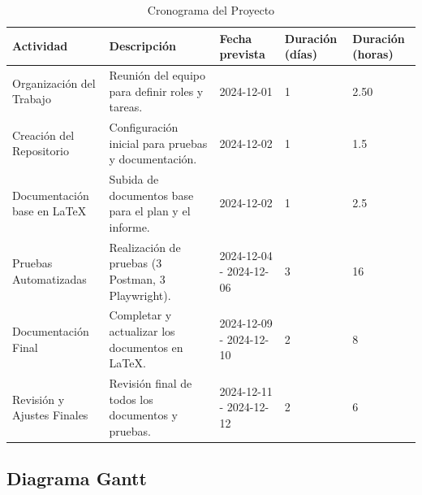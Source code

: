 \documentclass[stu, 12pt, letterpaper, donotrepeattitle, floatsintext, natbib]{apa7}
\begin{document}
\begin{table}[H]
    \centering
    \caption{Cronograma del Proyecto}
    \label{fig:cronograma}
    \begin{tabular}{|p{3cm}|p{4cm}|p{4cm}|p{1.8cm}|p{1.8cm}|}
        \hline
        \textbf{Actividad} & \textbf{Descripción} & \textbf{Fecha prevista} & \textbf{Duración (días)} & \textbf{Duración (horas)} \\ \hline
        Organización del Trabajo & Reunión del equipo para definir roles y tareas. & 2024-12-01  & 1 & 2.50 \\ \hline
        Creación del Repositorio & Configuración inicial para pruebas y documentación. & 2024-12-02 & 1 & 1.5 \\ \hline
        Documentación base en LaTeX & Subida de documentos base para el plan y el informe. & 2024-12-02 & 1 & 2.5 \\ \hline
        Pruebas Automatizadas & Realización de pruebas (3 Postman, 3 Playwright). & 2024-12-04 - 2024-12-06 & 3 & 16 \\ \hline
        Documentación Final & Completar y actualizar los documentos en LaTeX. & 2024-12-09 - 2024-12-10 & 2 & 8 \\ \hline
        Revisión y Ajustes Finales & Revisión final de todos los documentos y pruebas. & 2024-12-11 - 2024-12-12 & 2 & 6 \\ \hline
    \end{tabular}
\end{table}

\subsection*{Diagrama Gantt}
\end{document}
